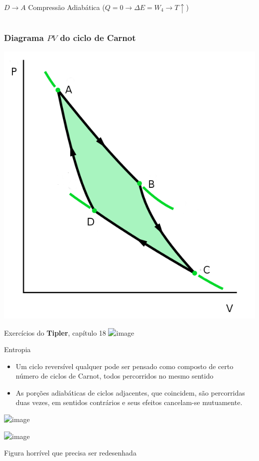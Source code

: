 \documentclass[t,%
brazilian,%
11pt,%
aspectratio=169,%
table%
]{beamer}
\begin{document}
\begin{frame}
\begin{columns}
\begin{column}{0.45\textwidth}
            \(D \rightarrow A\) Compressão Adiabática (\(Q=0 \rightarrow \Delta E = W_4 \rightarrow T \uparrow \))
        \end{column}
    \end{columns}
\end{frame}

\begin{frame}
    \frametitle{Diagrama \(PV\) do ciclo de Carnot}
    \centering
    \includegraphics[height=\textheight-27pt]{images/carnot-ciclo.png}
\end{frame}

\begin{frame}{Exercícios do \textbf{Tipler}, capítulo 18}
    \centering
    \includegraphics<+>[width=\textwidth]{images/Captura de tela de 2024-03-05 11-38-10.png}
\end{frame}

\begin{frame}{Entropia}
    \begin{itemize}
        \item Um ciclo reversível qualquer pode ser pensado como composto de
            certo número de ciclos de Carnot, todos percorridos no mesmo
            sentido
        \item As porções adiabáticas de ciclos adjacentes, que coincidem, são
            percorridas duas vezes, em sentidos contrários e seus efeitos
            cancelam-se mutuamente.
    \end{itemize}
    \centering
    \includegraphics<+>[height=\textheight-100pt]{images/termo12.jpg}

    \includegraphics<+>[height=\textheight-100pt]{images/image_4199.jpg}

    \tiny{Figura horrível que precisa ser redesenhada}
\end{frame}
\end{document}
